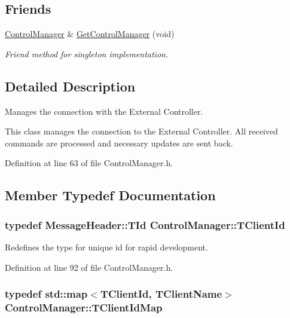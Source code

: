 \subsection*{Friends}
\begin{DoxyCompactItemize}
\item 
\hyperlink{class_control_manager}{Control\-Manager} \& \hyperlink{class_control_manager_a63bfd4667c9c70297f25ae5e5176818e}{Get\-Control\-Manager} (void)
\begin{DoxyCompactList}\small\item\em Friend method for singleton implementation. \end{DoxyCompactList}\end{DoxyCompactItemize}


\subsection{Detailed Description}
Manages the connection with the External Controller. 

This class manages the connection to the External Controller. All received commands are processed and necessary updates are sent back. 

Definition at line 63 of file Control\-Manager.\-h.



\subsection{Member Typedef Documentation}
\hypertarget{class_control_manager_a1bff13cab35db39c43f81f49b56e4849}{
\subsubsection[{T\-Client\-Id}]{\setlength{\rightskip}{0pt plus 5cm}typedef {\bf Message\-Header\-::\-T\-Id} {\bf Control\-Manager\-::\-T\-Client\-Id}}}\label{class_control_manager_a1bff13cab35db39c43f81f49b56e4849}


Redefines the type for unique id for rapid development. 



Definition at line 92 of file Control\-Manager.\-h.

\hypertarget{class_control_manager_a5f6aa6ca619f6aa8dddfc3d5000162f0}{
\subsubsection[{T\-Client\-Id\-Map}]{\setlength{\rightskip}{0pt plus 5cm}typedef std\-::map$<${\bf T\-Client\-Id}, {\bf T\-Client\-Name}$>$ {\bf Control\-Manager\-::\-T\-Client\-Id\-Map}\hspace{0.3cm}{\ttfamily [private]}}}\label{class_control_manager_a5f6aa6ca619f6aa8dddfc3d5000162f0}



